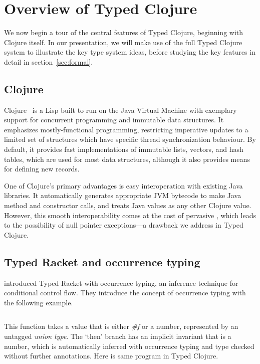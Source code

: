 \section{Overview of Typed Clojure}

\label{sec:overview}

We now begin a tour of the central features of Typed Clojure,
beginning with Clojure itself. In our presentation, we will make 
use of the full Typed Clojure system to illustrate the key type system
ideas, before studying the key features in detail in
section~\ref{sec:formal}. 

\subsection{Clojure}

Clojure~\cite{Hic08} is a Lisp built to run on the
Java Virtual Machine with exemplary support for concurrent programming
and immutable data structures. It emphasizes mostly-functional
programming, restricting imperative updates to a limited set of
structures which have specific thread synchronization behaviour. By
default, it provides fast implementations of immutable lists, vectors,
and hash tables, which are used for most data structures, although it
also provides means for defining new records.

One of Clojure's primary advantages is easy interoperation with
existing Java libraries. It automatically generates appropriate JVM
bytecode to make Java method and constructor calls, and treats Java
values as any other Clojure value. However, this smooth
interoperability comes at the cost of pervasive , which
leads to the possibility of null pointer exceptions---a drawback we
address in Typed Clojure.

\subsection{Typed Racket and occurrence typing}

\citet{TF10}
introduced Typed Racket with occurrence typing,
an inference technique for conditional control flow.
They introduce the concept of occurrence typing 
with the following example.

\inputminted[firstline=1]{racket}{code/tr/example1.rkt}

This function takes a value that is either \emph{\#f} %
or a number, represented by an untagged \emph{union type}.
The `then' branch has an implicit invariant
that  is a number, which is automatically inferred with occurrence typing
and type checked without further annotations.
Here is same program in Typed Clojure.

